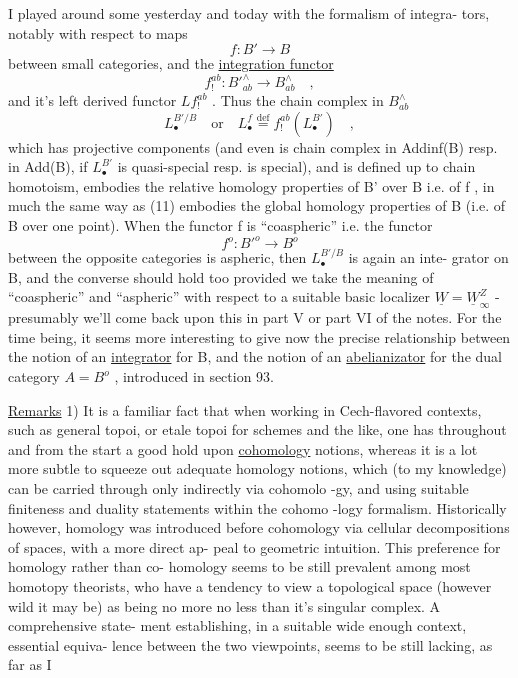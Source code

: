 
I played around some yesterday and today with the formalism of integra-%
tors,  notably with respect to maps
\[ f : B' \longrightarrow B \]
between small categories,  and the  \uline{integration functor}
\[ f_{!}^{ab} : B'^{\wedge}_{ab} \longrightarrow B^{\wedge}_{ab} \quad , \]
and it's left derived functor $Lf_{!}^{ab}$ .  Thus the chain complex in $B^{\wedge}_{ab}$
  \[ L_{\bullet}^{B'/B} \quad \text{or} \quad L_{\bullet}^{f} \overset{\text{def}}{=} f_{!}^{ab}(L_{\bullet}^{B'}) \quad , \]
which   has projective components (and even is  chain
complex in Addinf(B)  resp. in Add(B),  if $L_{\bullet}^{B'}$ is quasi-special  resp. is
special),  and is defined up to chain homotoism,  embodies the relative
homology properties of B' over B  i.e. of f ,  in much the same way as (11)
embodies the global homology properties of B  (i.e. of B over one point).
When the functor f is ``coaspheric''  i.e. the functor
\[ f^{o} : B'^{o} \longrightarrow B^{o} \]
between the opposite categories is aspheric,  then $L_{\bullet}^{B'/B}$ is again an inte-%
grator on B,  and the converse should hold too provided we take the meaning
of ``coaspheric'' and ``aspheric'' with respect to a suitable basic localizer
$\underline{W} = \underline{W}_{\infty}^{Z}$  -  presumably we'll come back upon this in part V or part VI of
the notes.  For the time being,  it seems more interesting to give now the
precise relationship between the notion of an \uline{integrator}\xout{,} for B,  and the
notion of an \uline{abelianizator} for the dual category $A = B^{o}$ ,  introduced in
section 93.

\uline{Remarks}  1)  It is a familiar fact that when working in \hand{\v{}}Cech-flavored
contexts,  such as general topoi,  or etale topoi for schemes and the like,
one has throughout and from the start a good hold upon \uline{cohomology} notions,
whereas it is a lot more subtle to squeeze out adequate homology notions,
which (to my knowledge) can be carried through only indirectly via cohomolo%
-gy,  and using suitable finiteness and duality statements within the cohomo%
-logy formalism.  Historically however,  homology was introduced before
cohomology via cellular decompositions of spaces,  with a more direct ap-%
peal to geometric intuition.  This preference for homology rather than co-%
homology seems to be  still prevalent among most homotopy theorists, who
have a tendency to view a topological space (however wild it may be) as
being no more no less than it's singular complex.  A comprehensive state-%
ment establishing,  in a suitable wide enough context,  essential equiva-%
lence between the two viewpoints,  seems to be still lacking,  as far as I

